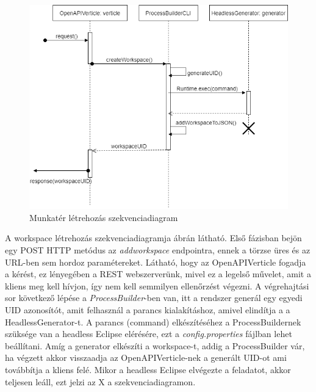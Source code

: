 \begin{figure}[!ht]
	\includegraphics[width=150mm, keepaspectratio]{figures/add_workspace_seq.png}
	\caption{Munkatér létrehozás szekvenciadiagram}
	\label{fig:addworkspace}
\end{figure}

A workspace létrehozás szekvenciadiagramja  ábrán látható. Első fázisban bejön egy POST HTTP metódus az \textit{addworkspace} endpointra, ennek a törzse üres és az URL-ben sem hordoz paramétereket. Látható, hogy az OpenAPIVerticle fogadja a kérést, ez lényegében a REST webszerverünk, mivel ez a legelső művelet, amit a kliens meg kell hívjon, így nem kell semmilyen ellenőrzést végezni. A végrehajtási sor következő lépése a \textit{ProcessBuilder}-ben van, itt a rendszer generál egy egyedi UID azonosítót, amit felhasznál a parancs kialakításhoz, amivel elindítja a a HeadlessGenerator-t. A parancs (command) elkészítéséhez a ProcessBuildernek szüksége van a headless Eclipse elérésére, ezt a \textit{config.properties} fájlban lehet beállítani. Amíg a generator elkészíti a workspace-t, addig a ProcessBuilder vár, ha végzett akkor visszaadja az OpenAPIVerticle-nek a generált UID-ot ami továbbítja a kliens felé. Mikor a headless Eclipse elvégezte a feladatot, akkor teljesen leáll, ezt jelzi az X a szekvenciadiagramon.


